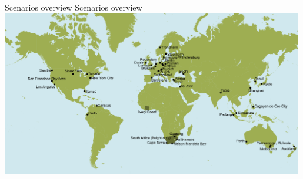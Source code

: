 \createfigure%
{Scenarios overview}%
{Scenarios overview }%
{\label{fig:scenarios}}%
{\includegraphics[width=0.99\textwidth, angle=0]{./scenarios/figures/MATSimModelsMap}}%
{}



%
%
%
%
%

